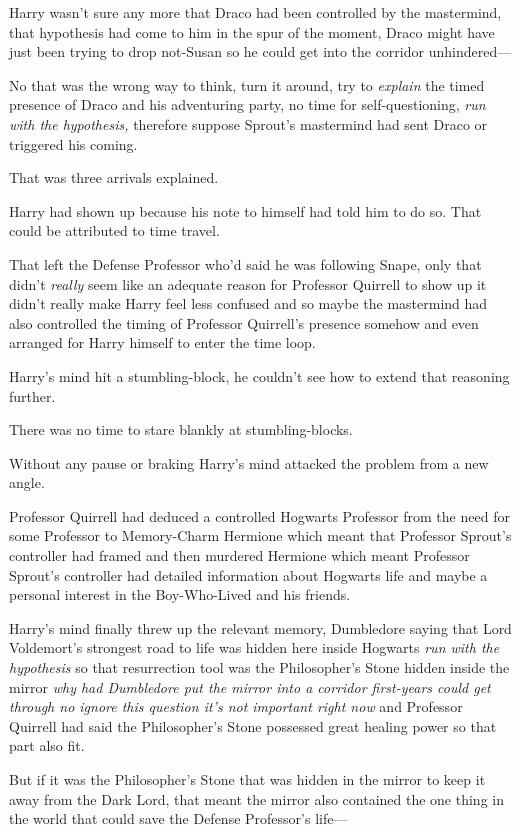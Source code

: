 Harry wasn't sure any more that Draco had been controlled by the mastermind,
that hypothesis had come to him in the spur of the moment, Draco might have
just been trying to drop not-Susan so he could get into the corridor unhindered—

No that was the wrong way to think, turn it around, try to \emph{explain} the
timed presence of Draco and his adventuring party, no time for
self-questioning, \emph{run with the hypothesis,} therefore suppose Sprout's
mastermind had sent Draco or triggered his coming.

That was three arrivals explained.

Harry had shown up because his note to himself had told him to do so. That
could be attributed to time travel.

That left the Defense Professor who'd said he was following Snape, only that
didn't \emph{really} seem like an adequate reason for Professor Quirrell to
show up it didn't really make Harry feel less confused and so maybe the
mastermind had also controlled the timing of Professor Quirrell's presence
somehow and even arranged for Harry himself to enter the time loop.

Harry's mind hit a stumbling-block, he couldn't see how to extend that
reasoning further.

There was no time to stare blankly at stumbling-blocks.

Without any pause or braking Harry's mind attacked the problem from a new angle.

Professor Quirrell had deduced a controlled Hogwarts Professor from the need
for some Professor to Memory-Charm Hermione which meant that Professor Sprout's
controller had framed and then murdered Hermione which meant Professor Sprout's
controller had detailed information about Hogwarts life and maybe a personal
interest in the Boy-Who-Lived and his friends.

Harry's mind finally threw up the relevant memory, Dumbledore saying that Lord
Voldemort's strongest road to life was hidden here inside Hogwarts \emph{run
with the hypothesis} so that resurrection tool was the Philosopher's Stone
hidden inside the mirror \emph{why had Dumbledore put the mirror into a
corridor first-years could get through no ignore this question it's not
important right now} and Professor Quirrell had said the Philosopher's Stone
possessed great healing power so that part also fit.

But if it was the Philosopher's Stone that was hidden in the mirror to keep it
away from the Dark Lord, that meant the mirror also contained the one thing in
the world that could save the Defense Professor's life—

